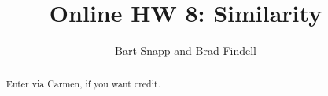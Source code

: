 \documentclass[nooutcomes]{xourse}
\title{Online HW 8: Similarity}
\author{Bart Snapp and Brad Findell}
\begin{document}
\begin{abstract}
Enter via Carmen, if you want credit.  
\end{abstract}
\maketitle

{}
\end{document}
